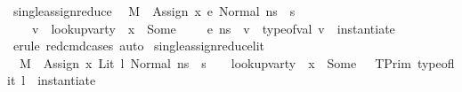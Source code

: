 \begin{isabellebody}
\endisatagproof
{\isafoldproof}%
%
\isadelimproof
\isanewline
%
\endisadelimproof
\isanewline
{}\isamarkupfalse%
\ single{\isacharunderscore}{\kern0pt}assign{\isacharunderscore}{\kern0pt}reduce{\isacharunderscore}{\kern0pt}{}{\isacharcolon}{\kern0pt}\isanewline
\ \ {\isachardoublequoteopen}M{\isacharcomma}{\kern0pt}{\isasymLambda}{\isacharcomma}{\kern0pt}{\isasymGamma}{\isacharcomma}{\kern0pt}{\isasymOmega}\ {\isasymturnstile}\ {\isasymlangle}Assign\ x\ e{\isacharcomma}{\kern0pt}\ Normal\ n{\isacharunderscore}{\kern0pt}s{\isasymrangle}\ {\isasymrightarrow}\ s{\isacharprime}{\kern0pt}\ {\isasymLongrightarrow}\ \ \isanewline
\ \ \ \ {\isacharparenleft}{\kern0pt}{\isasymexists}v\ {\isasymtau}{\isachardot}{\kern0pt}\ {\isacharparenleft}{\kern0pt}lookup{\isacharunderscore}{\kern0pt}var{\isacharunderscore}{\kern0pt}ty\ {\isasymLambda}\ x\ {\isacharequal}{\kern0pt}\ Some\ {\isasymtau}{\isacharparenright}{\kern0pt}\ {\isasymand}\ {\isacharparenleft}{\kern0pt}{\isasymLambda}{\isacharcomma}{\kern0pt}{\isasymGamma}{\isacharcomma}{\kern0pt}{\isasymOmega}\ {\isasymturnstile}\ {\isasymlangle}e{\isacharcomma}{\kern0pt}\ n{\isacharunderscore}{\kern0pt}s{\isasymrangle}\ {\isasymDown}\ v{\isacharparenright}{\kern0pt}\ {\isasymand}\ type{\isacharunderscore}{\kern0pt}of{\isacharunderscore}{\kern0pt}val\ v\ {\isacharequal}{\kern0pt}\ instantiate\ {\isasymOmega}\ {\isasymtau}{\isacharparenright}{\kern0pt}{\isachardoublequoteclose}\isanewline
%
\isadelimproof
\ \ %
\endisadelimproof
%
\isatagproof
{}\isamarkupfalse%
\ {\isacharparenleft}{\kern0pt}erule\ red{\isacharunderscore}{\kern0pt}cmd{\isachardot}{\kern0pt}cases{\isacharparenright}{\kern0pt}\ auto%
\endisatagproof
{\isafoldproof}%
%
\isadelimproof
\isanewline
%
\endisadelimproof
\isanewline
{}\isamarkupfalse%
\ single{\isacharunderscore}{\kern0pt}assign{\isacharunderscore}{\kern0pt}reduce{\isacharunderscore}{\kern0pt}lit{\isacharcolon}{\kern0pt}\isanewline
\ \ {\isachardoublequoteopen}M{\isacharcomma}{\kern0pt}{\isasymLambda}{\isacharcomma}{\kern0pt}{\isasymGamma}{\isacharcomma}{\kern0pt}{\isasymOmega}\ {\isasymturnstile}\ {\isasymlangle}Assign\ x\ {\isacharparenleft}{\kern0pt}Lit\ l{\isacharparenright}{\kern0pt}{\isacharcomma}{\kern0pt}\ Normal\ n{\isacharunderscore}{\kern0pt}s{\isasymrangle}\ {\isasymrightarrow}\ s{\isacharprime}{\kern0pt}\ {\isasymLongrightarrow}\ \ {\isasymexists}{\isasymtau}{\isachardot}{\kern0pt}\ lookup{\isacharunderscore}{\kern0pt}var{\isacharunderscore}{\kern0pt}ty\ {\isasymLambda}\ x\ {\isacharequal}{\kern0pt}\ Some\ {\isasymtau}\ {\isasymand}\ {\isacharparenleft}{\kern0pt}TPrim\ {\isacharparenleft}{\kern0pt}type{\isacharunderscore}{\kern0pt}of{\isacharunderscore}{\kern0pt}lit\ l{\isacharparenright}{\kern0pt}{\isacharparenright}{\kern0pt}\ {\isacharequal}{\kern0pt}\ instantiate\ {\isasymOmega}\ {\isasymtau}{\isachardoublequoteclose}\isanewline

\end{isabellebody}
